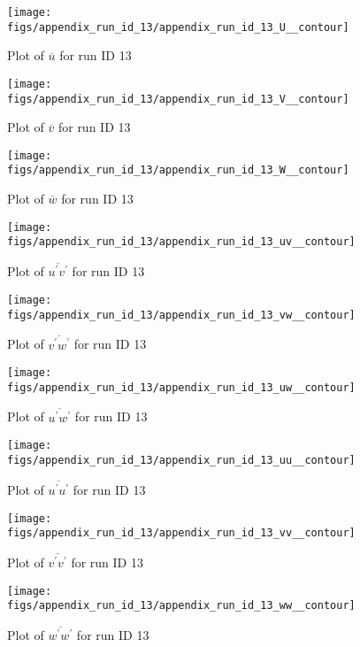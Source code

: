 \begin{figure}[H]
\centering
\texttt{[image: figs/appendix\_run\_id\_13/appendix\_run\_id\_13\_U\_\_contour]}
\caption{Plot of $\overline{u}$ for run ID 13}
\label{fig:appendix_run_id_13_U__contour}
\end{figure}


\begin{figure}[H]
\centering
\texttt{[image: figs/appendix\_run\_id\_13/appendix\_run\_id\_13\_V\_\_contour]}
\caption{Plot of $\overline{v}$ for run ID 13}
\label{fig:appendix_run_id_13_V__contour}
\end{figure}


\begin{figure}[H]
\centering
\texttt{[image: figs/appendix\_run\_id\_13/appendix\_run\_id\_13\_W\_\_contour]}
\caption{Plot of $\overline{w}$ for run ID 13}
\label{fig:appendix_run_id_13_W__contour}
\end{figure}


\begin{figure}[H]
\centering
\texttt{[image: figs/appendix\_run\_id\_13/appendix\_run\_id\_13\_uv\_\_contour]}
\caption{Plot of $\overline{u^\prime v^\prime}$ for run ID 13}
\label{fig:appendix_run_id_13_uv__contour}
\end{figure}


\begin{figure}[H]
\centering
\texttt{[image: figs/appendix\_run\_id\_13/appendix\_run\_id\_13\_vw\_\_contour]}
\caption{Plot of $\overline{v^\prime w^\prime}$ for run ID 13}
\label{fig:appendix_run_id_13_vw__contour}
\end{figure}


\begin{figure}[H]
\centering
\texttt{[image: figs/appendix\_run\_id\_13/appendix\_run\_id\_13\_uw\_\_contour]}
\caption{Plot of $\overline{u^\prime w^\prime}$ for run ID 13}
\label{fig:appendix_run_id_13_uw__contour}
\end{figure}


\begin{figure}[H]
\centering
\texttt{[image: figs/appendix\_run\_id\_13/appendix\_run\_id\_13\_uu\_\_contour]}
\caption{Plot of $\overline{u^\prime u^\prime}$ for run ID 13}
\label{fig:appendix_run_id_13_uu__contour}
\end{figure}


\begin{figure}[H]
\centering
\texttt{[image: figs/appendix\_run\_id\_13/appendix\_run\_id\_13\_vv\_\_contour]}
\caption{Plot of $\overline{v^\prime v^\prime}$ for run ID 13}
\label{fig:appendix_run_id_13_vv__contour}
\end{figure}


\begin{figure}[H]
\centering
\texttt{[image: figs/appendix\_run\_id\_13/appendix\_run\_id\_13\_ww\_\_contour]}
\caption{Plot of $\overline{w^\prime w^\prime}$ for run ID 13}
\label{fig:appendix_run_id_13_ww__contour}
\end{figure}


